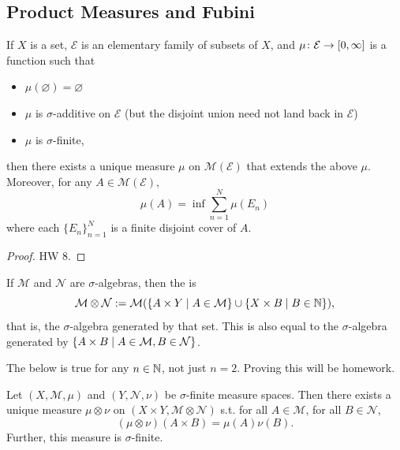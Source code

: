 \documentclass[11pt,leqno,oneside]{amsbook}
\numberwithin{thm}{section}
\newcommand{\M}{\mathcal{M}}
\newcommand{\E}{\mathcal{E}}
\newcommand{\cN}{\mathcal{N}}
\newcommand{\s}{$\sigma$-} %
\newcommand{\x}{\times}
\newcommand{\ox}{\otimes}
\renewcommand{\emptyset}{\varnothing}
\begin{document}
\subsection{Product Measures and Fubini}
\begin{thm}
  If $X$ is a set, $\E$ is an elementary family of subsets of $X$, and $\mu \from \E \to [0, \oo]$ is a function such that
  \begin{itemize}
    \item $\mu(\emptyset) = \emptyset$
    \item $\mu$ is \s additive on $\E$ (but the disjoint union need not land back in $\E$)
    \item $\mu$ is \s finite,
  \end{itemize}
  then there exists a unique measure $\mu$ on $\M(\E)$ that extends the above $\mu$.  Moreover, for any $A \in \M(\E)$, $$\mu(A) = \inf\sum_{n=1}^N \mu(E_n)$$ where each $\{E_n\}_{n=1}^N$ is a finite disjoint cover of $A$.
\end{thm}
\begin{proof}
  HW 8.
\end{proof}
\begin{defn}
  If $\M$ and $\cN$ are \s algebras, then the \de{product \s algebra} is $$\M \ox \cN := \M(\{A \x Y \st A \in \M\}\union\{X \x B \st B \in \N\}),$$ that is, the \s algebra generated by that set.  This is also equal to the \s algebra generated by $\{A \x B \st A \in \M, B \in \cN\}$.
\end{defn}
\begin{thm}
  The below is true for any $n \in {\mathbb N}$, not just $n = 2$.  Proving this will be homework.
\end{thm}
\begin{thm}
  Let $(X, \M, \mu)$ and $(Y, \cN, \nu)$ be \s finite measure spaces.  Then there exists a unique measure $\mu \ox \nu$ on $(X \x Y, \M \ox \cN)$ s.t. for all $A \in \M$, for all $B \in \cN$, $$(\mu \ox \nu)(A \x B) = \mu(A)\nu(B).$$  Further, this measure is \s finite.
\end{thm}
\end{document}

